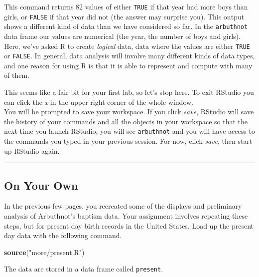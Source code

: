 \documentclass[
]{article}
\newenvironment{Shaded}{\begin{snugshade}}{\end{snugshade}}
\newcommand{\KeywordTok}[1]{\textcolor[rgb]{0.13,0.29,0.53}{\textbf{#1}}}
\newcommand{\NormalTok}[1]{#1}
\newcommand{\StringTok}[1]{\textcolor[rgb]{0.31,0.60,0.02}{#1}}
\begin{document}
This command returns 82 values of either \texttt{TRUE} if that year had
more boys than girls, or \texttt{FALSE} if that year did not (the answer
may surprise you). This output shows a different kind of data than we
have considered so far. In the \texttt{arbuthnot} data frame our values
are numerical (the year, the number of boys and girls). Here, we've
asked R to create \emph{logical} data, data where the values are either
\texttt{TRUE} or \texttt{FALSE}. In general, data analysis will involve
many different kinds of data types, and one reason for using R is that
it is able to represent and compute with many of them.

This seems like a fair bit for your first lab, so let's stop here. To
exit RStudio you can click the \emph{x} in the upper right corner of the
whole window.\\
You will be prompted to save your workspace. If you click \emph{save},
RStudio will save the history of your commands and all the objects in
your workspace so that the next time you launch RStudio, you will see
\texttt{arbuthnot} and you will have access to the commands you typed in
your previous session. For now, click \emph{save}, then start up RStudio
again.

\begin{center}\rule{0.5\linewidth}{0.5pt}\end{center}

\hypertarget{on-your-own}{%
\subsection{On Your Own}\label{on-your-own}}

In the previous few pages, you recreated some of the displays and
preliminary analysis of Arbuthnot's baptism data. Your assignment
involves repeating these steps, but for present day birth records in the
United States. Load up the present day data with the following command.

\begin{Shaded}
\begin{Highlighting}[]
\KeywordTok{source}\NormalTok{(}\StringTok{"more/present.R"}\NormalTok{)}
\end{Highlighting}
\end{Shaded}

The data are stored in a data frame called \texttt{present}.
\end{document}
